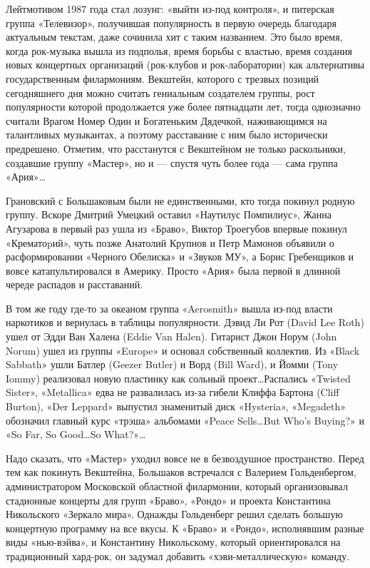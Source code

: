 \documentclass[10pt, twoside]{book}
\begin{document}
Лейтмотивом 1987 года стал лозунг: «выйти из-под контроля», и питерская группа «Телевизор», получившая популярность в
первую очередь благодаря актуальным текстам, даже сочинила хит с таким названием. Это было время, когда рок-музыка вышла
из подполья, время борьбы с властью, время создания новых концертных организаций (рок-клубов и рок-лаборатории) как
альтернативы государственным филармониям. Векштейн, которого с трезвых позиций сегодняшнего дня можно считать гениальным
создателем группы, рост популярности которой продолжается уже более пятнадцати лет, тогда однозначно считали Врагом
Номер Один и Богатеньким Дядечкой, наживающимся на талантливых музыкантах, а поэтому расставание с ним было исторически
предрешено. Отметим, что расстанутся с Векштейном не только раскольники, создавшие группу «Мастер», но и — спустя чуть
более года — сама группа «Ария»\ldots

Грановский с Большаковым были не единственными, кто тогда покинул родную группу. Вскоре Дмитрий Умецкий оставил
«Наутилус Помпилиус», Жанна Агузарова в первый раз ушла из «Браво», Виктор Троегубов впервые покинул «Крематоpий», чуть
позже Анатолий Крупнов и Петр Мамонов объявили о расформировании «Черного Обелиска» и «Звуков МУ», а Борис Гребенщиков и
вовсе катапультировался в Америку. Просто «Ария» была первой в длинной череде распадов и расставаний.

В том же году где-то за океаном группа «Aerosmith» вышла из-под власти наркотиков и вернулась в таблицы популярности.
Дэвид Ли Рот (David Lee Roth) ушел от Эдди Ван Халена (Eddie Van Halen). Гитарист Джон Норум (John Norum) ушел из группы
«Europe» и основал собственный коллектив. Из «Black Sabbath» ушли Батлер (Geezer Butler) и Ворд (Bill Ward), и Йомми
(Tony Iommy) реализовал новую пластинку как сольный проект\ldots Распались «Twisted Sister», «Metallica» едва не
развалилась из-за гибели Клиффа Бартона (Cliff Burton), «Der Leppard» выпустил знаменитый диск «Hysteria», «Megadeth»
обозначил главный курс «трэша» альбомами «Peace Sells\ldots But Who's Buying?» и «So Far, So Good\ldots So What?»\ldots

Надо сказать, что «Мастер» уходил вовсе не в безвоздушное пространство. Перед тем как покинуть Векштейна, Большаков
встречался с Валерием Гольденбергом, администратором Московской областной филармонии, который организовывал стадионные
концерты для групп «Браво», «Рондо» и проекта Константина Никольского «Зеркало мира». Однажды Гольденберг решил сделать
большую концертную программу на все вкусы. К «Браво» и «Рондо», исполнявшим разные виды «нью-вэйва», и Константину
Никольскому, который ориентировался на традиционный хард-рок, он задумал добавить «хэви-металлическую» команду.
\end{document}
